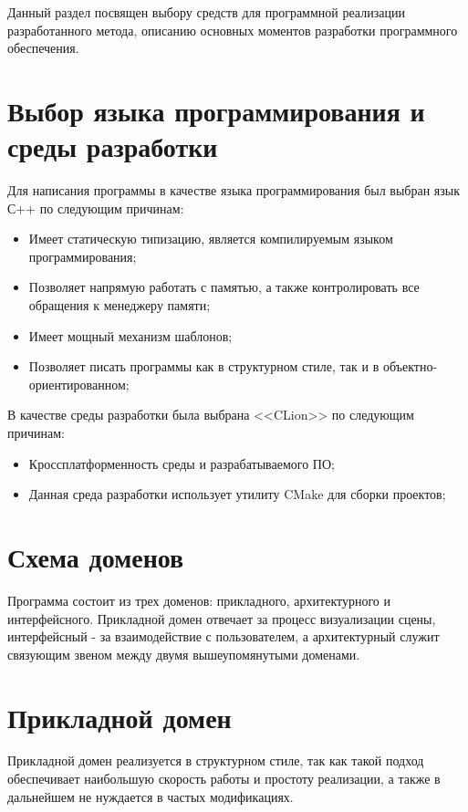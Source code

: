 Данный раздел посвящен выбору средств для программной реализации разработанного метода, описанию основных моментов разработки программного обеспечения.

\section{Выбор языка программирования и среды разработки}

Для написания программы в качестве языка программирования был выбран язык С++ по следующим причинам:

\begin{itemize}
	\item Имеет статическую типизацию, является компилируемым языком программирования;
	\item Позволяет напрямую работать с памятью, а также контролировать все обращения к менеджеру памяти;
	\item Имеет мощный механизм шаблонов;
	\item Позволяет писать программы как в структурном стиле, так и в объектно-ориентированном;
\end{itemize}

В качестве среды разработки была выбрана <<CLion>> по следующим причинам:

\begin{itemize}
	\item Кроссплатформенность среды и разрабатываемого ПО;
	\item Данная среда разработки использует утилиту CMake для сборки проектов;
\end{itemize}

\section{Схема доменов}

Программа состоит из трех доменов: прикладного, архитектурного и интерфейсного. Прикладной домен отвечает за процесс визуализации сцены, интерфейсный - за взаимодействие с пользователем, а архитектурный служит связующим звеном между двумя вышеупомянутыми доменами.

\section{Прикладной домен}

Прикладной домен реализуется в структурном стиле, так как такой подход обеспечивает наибольшую скорость работы и простоту реализации, а также в дальнейшем не нуждается в частых модификациях.

